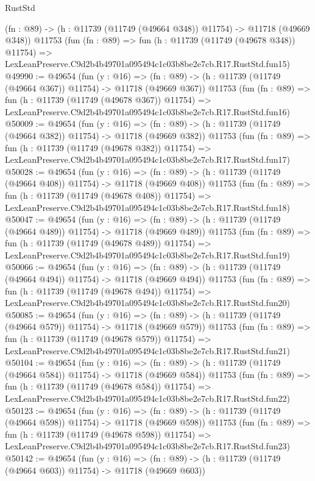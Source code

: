 \begin{lexlean}{RustStd}
\begin{coremodule}
    (fn : @89) -> (h : @11739 (@11749 (@49664 @348)) @11754) -> @11718 (@49669 @348))
    @11753
    (fun (fn : @89) =>
    fun (h : @11739 (@11749 (@49678 @348)) @11754) =>
    LexLeanPreserve.C9d2b4b49701a095494c1c03b8be2e7cb.R17.RustStd.fun15)
@49990 := @49654
    (fun (y : @16) =>
    (fn : @89) -> (h : @11739 (@11749 (@49664 @367)) @11754) -> @11718 (@49669 @367))
    @11753
    (fun (fn : @89) =>
    fun (h : @11739 (@11749 (@49678 @367)) @11754) =>
    LexLeanPreserve.C9d2b4b49701a095494c1c03b8be2e7cb.R17.RustStd.fun16)
@50009 := @49654
    (fun (y : @16) =>
    (fn : @89) -> (h : @11739 (@11749 (@49664 @382)) @11754) -> @11718 (@49669 @382))
    @11753
    (fun (fn : @89) =>
    fun (h : @11739 (@11749 (@49678 @382)) @11754) =>
    LexLeanPreserve.C9d2b4b49701a095494c1c03b8be2e7cb.R17.RustStd.fun17)
@50028 := @49654
    (fun (y : @16) =>
    (fn : @89) -> (h : @11739 (@11749 (@49664 @408)) @11754) -> @11718 (@49669 @408))
    @11753
    (fun (fn : @89) =>
    fun (h : @11739 (@11749 (@49678 @408)) @11754) =>
    LexLeanPreserve.C9d2b4b49701a095494c1c03b8be2e7cb.R17.RustStd.fun18)
@50047 := @49654
    (fun (y : @16) =>
    (fn : @89) -> (h : @11739 (@11749 (@49664 @489)) @11754) -> @11718 (@49669 @489))
    @11753
    (fun (fn : @89) =>
    fun (h : @11739 (@11749 (@49678 @489)) @11754) =>
    LexLeanPreserve.C9d2b4b49701a095494c1c03b8be2e7cb.R17.RustStd.fun19)
@50066 := @49654
    (fun (y : @16) =>
    (fn : @89) -> (h : @11739 (@11749 (@49664 @494)) @11754) -> @11718 (@49669 @494))
    @11753
    (fun (fn : @89) =>
    fun (h : @11739 (@11749 (@49678 @494)) @11754) =>
    LexLeanPreserve.C9d2b4b49701a095494c1c03b8be2e7cb.R17.RustStd.fun20)
@50085 := @49654
    (fun (y : @16) =>
    (fn : @89) -> (h : @11739 (@11749 (@49664 @579)) @11754) -> @11718 (@49669 @579))
    @11753
    (fun (fn : @89) =>
    fun (h : @11739 (@11749 (@49678 @579)) @11754) =>
    LexLeanPreserve.C9d2b4b49701a095494c1c03b8be2e7cb.R17.RustStd.fun21)
@50104 := @49654
    (fun (y : @16) =>
    (fn : @89) -> (h : @11739 (@11749 (@49664 @584)) @11754) -> @11718 (@49669 @584))
    @11753
    (fun (fn : @89) =>
    fun (h : @11739 (@11749 (@49678 @584)) @11754) =>
    LexLeanPreserve.C9d2b4b49701a095494c1c03b8be2e7cb.R17.RustStd.fun22)
@50123 := @49654
    (fun (y : @16) =>
    (fn : @89) -> (h : @11739 (@11749 (@49664 @598)) @11754) -> @11718 (@49669 @598))
    @11753
    (fun (fn : @89) =>
    fun (h : @11739 (@11749 (@49678 @598)) @11754) =>
    LexLeanPreserve.C9d2b4b49701a095494c1c03b8be2e7cb.R17.RustStd.fun23)
@50142 := @49654
    (fun (y : @16) =>
    (fn : @89) -> (h : @11739 (@11749 (@49664 @603)) @11754) -> @11718 (@49669 @603))

\end{coremodule}
\end{lexlean}
